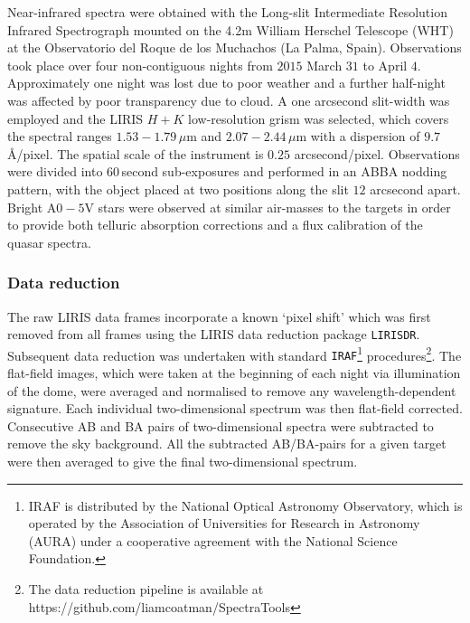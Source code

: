 Near-infrared spectra were obtained with the Long-slit Intermediate Resolution Infrared Spectrograph \citep[LIRIS;][]{manchado98} mounted on the 4.2m William Herschel Telescope (WHT) at the Observatorio del Roque de los Muchachos (La Palma, Spain). 
Observations took place over four non-contiguous nights from $2015$ March $31$ to April $4$. 
Approximately one night was lost due to poor weather and a further half-night was affected by poor transparency due to cloud. 
A one arcsecond slit-width was employed and the LIRIS $H+K$ low-resolution grism was selected, which covers the spectral ranges $1.53-1.79$\,$\mu$m and $2.07-2.44$\,$\mu$m with a dispersion of $9.7$\,\AA/pixel. 
The spatial scale of the instrument is $0.25$ arcsecond/pixel. 
Observations were divided into 60\,second sub-exposures and performed in an ABBA nodding pattern, with the object placed at two positions along the slit $12$ arcsecond apart. 
Bright A$0-5$V stars were observed at similar air-masses to the targets in order to provide both telluric absorption corrections and a flux calibration of the quasar spectra.

\subsubsection{Data reduction}

The raw LIRIS data frames incorporate a known `pixel shift' which was first removed from all frames using the LIRIS data reduction package {\tt LIRISDR}. 
Subsequent data reduction was undertaken with standard {\tt IRAF}\footnote{IRAF is distributed by the National Optical Astronomy Observatory, which is operated by the Association of Universities for Research in Astronomy (AURA) under a cooperative agreement with the National Science Foundation.} procedures\footnote{The data reduction pipeline is available at https://github.com/liamcoatman/SpectraTools}.  
The flat-field images, which were taken at the beginning of each night via illumination of the dome, were averaged and normalised to remove any wavelength-dependent signature. 
Each individual two-dimensional spectrum was then flat-field corrected. 
Consecutive AB and BA pairs of two-dimensional spectra were subtracted to remove the sky background. 
All the subtracted AB/BA-pairs for a given target were then averaged to give the final two-dimensional spectrum.

